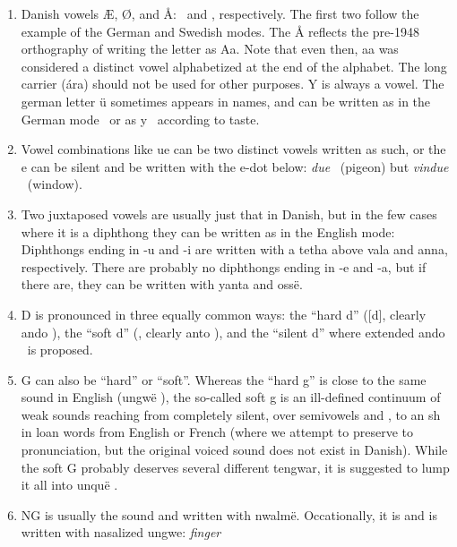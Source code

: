 \documentclass[a4paper]{article}
\begin{document}
\begin{enumerate}
\item Danish vowels Æ, Ø, and Å: \Ttelco\TTinvertedthreedots\Ts
  \Ttelco\TTdoubleacute ~and \Taara\TTthreedots, respectively.  The
  first two follow the example of the German and Swedish modes.  The Å
  reflects the pre-1948 orthography of writing the letter as Aa.  Note
  that even then, aa was considered a distinct vowel alphabetized at
  the end of the alphabet.  The long carrier (\'ara) should not be
  used for other purposes.  Y is always a vowel.  The german letter
  \"u sometimes appears in names, and can be written as in the German
  mode \Ttelco\TTtwodots ~or as y \Ttelco\TTbreve ~according to
  taste.\label{notevokal}
\item Vowel combinations like ue can be two distinct vowels written as
  such, or the e can be silent and be written with the e-dot below: \emph{due}
  \Tando\Ttelco\TTleftcurl\Ttelco\TTacute ~(pigeon) but
  \emph{vindue}
  \Tampa\Tando\TTnasalizer\TTdot\Ttelco\TTleftcurl\TTdotbelow
  ~(window). 
\item Two juxtaposed vowels are usually just that in Danish, but in
  the few cases where it is a diphthong they can be 
  written as in the English mode: Diphthongs ending in -u and -i are written
  with a tetha above vala and anna, respectively.  There are probably
  no diphthongs ending in -e and -a, but if there are, they can be
  written with yanta and oss\"e.\label{noteDif}
\item D is pronounced in three equally common ways: the ``hard d''
  ([d], clearly ando \Tando), the ``soft d'' (\textipa{[D]}, clearly anto \Tanto), and the
  ``silent d'' where extended ando
  \Textendedando ~is proposed.\label{noteD}
\item G can also be ``hard'' or ``soft''.  Whereas the ``hard g'' is
  close to the same sound in English (ungw\"e \Tungwe), the so-called
  soft g is an ill-defined continuum of weak sounds reaching from
  completely silent, over semivowels \textipa{[I]} and \textipa{[U]},
  to an sh \textipa{[S]} in loan words from English or French (where
  we attempt to preserve to pronunciation, but the original voiced sound
  \textipa{[Z]} does not exist in Danish).  While the soft G
  probably deserves several different tengwar, it is suggested to lump
  it all into unqu\"e \Tunque.\label{noteG}
  \item NG is usually the sound \textipa{[N]} and written with
    nwalm\"e.  Occationally, it is \textipa{[Ng]} and is written with
    nasalized ungwe: \emph{finger}

\end{enumerate}
\end{document}
